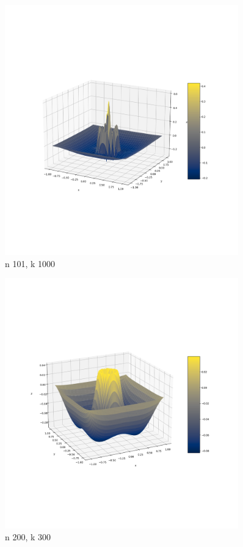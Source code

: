 \documentclass{article}
\begin{document}
    \begin{figure}[h]
        \centering
        \includegraphics[width=0.9\textwidth]{nal1_n101_k1000.png}
        \caption{n 101, k 1000}
    \end{figure}

    \begin{figure}[h]
        \centering
        \includegraphics[width=0.9\textwidth]{nal1_n200_k300.png}
        \caption{n 200, k 300}
    \end{figure}
\end{document}
